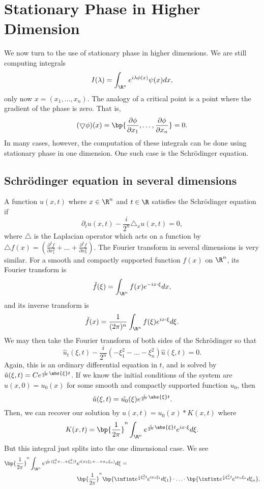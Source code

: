 \section{Stationary Phase in Higher Dimension}
We now turn to the use of stationary phase in higher dimensions. We are still computing integrals
\[
I(\lambda) = \int_{\R^n} e^{i\lambda \phi(x)}\psi(x)dx,
\]
only now $x = (x_1, \ldots, x_n)$. The analogy of a critical point is a point where the gradient of the phase is zero. That is,
\[
(\bigtriangledown \phi)(x) = \bp{\frac{\partial\phi}{\partial x_1}, \ldots, \frac{\partial\phi}{\partial x_n}} = 0.
\]
In many cases, however, the computation of these integrals can be done using stationary phase in one dimension. One such case is the Schr{\"o}dinger equation.
\subsection{Schr{\"o}dinger equation in several dimensions}
A function $u(x, t)$ where $x \in \R^n$ and $t \in \R$ satisfies the Schr{\"o}dinger equation if
\[
	\partial_t u(x, t) - \frac{i}{2^n}\triangle_x u(x, t) = 0,
\]
where $\triangle$ is the Laplacian operator which acts on a function by $\triangle f(x) = (\frac{\partial^2 f}{\partial x_1^2} + \ldots + \frac{\partial^2 f}{\partial x_n^2})$. 
The Fourier transform in several dimensions is very similar. For a smooth and compactly supported function $f(x)$ on $\R^n$, its Fourier transform is
\[
	\hat{f}(\xi) = \int_{\R^n}f(x)e^{-ix\cdot\xi}dx,
\]
and its inverse transform is
\[
	\check{f}(x) = \frac{1}{(2\pi)^n}\int_{\R^n}f(\xi)e^{ix\cdot\xi}d\xi.
\]
We may then take the Fourier transform of both sides of the Schr{\"o}dinger so that
\[
	\hat{u}_t(\xi, t) -\frac{i}{2^n}(-\xi_1^2 - \ldots -\xi_n^2)\hat{u}(\xi, t) = 0.
\]
Again, this is an ordinary differential equation in $t$, and is solved by $\hat{u}(\xi, t) = Ce^{\frac{i}{2^n}\abs{\xi}t}$. If we know the initial conditions of the system are $u(x, 0) = u_0(x)$ for some smooth and compactly supported function $u_0$, then
\[
	\hat{u}(\xi, t) = \hat{u_0}(\xi)e^{\frac{i}{2^n}\abs{\xi}t}.
\]
Then, we can recover our solution by $u(x, t) = u_0(x) \ast K(x, t)$ where
\[
	K(x, t) = \bp{\frac{1}{2\pi}}^n \int_{\R^n} e^{\frac{i}{2^n}\abs{\xi}t}e^{ix\cdot\xi}d\xi.
\]
But this integral just splits into the one dimensional case. We see
\begin{align}
	\notag
	\bp{\frac{1}{2\pi}}^n\int_{\R^n}e^{\frac{i}{2^n}(\xi_1^2 + \ldots + \xi_n^2)t}&e^{i(x_1\xi_1 + \ldots + x_n\xi_n)}d\xi = \\
	\notag &\bp{\frac{1}{2\pi}}^n\bp{\infint e^{\frac{i}{2}\xi_1^2t}e^{ix_1\xi_1}d\xi_1}\cdot\ldots\cdot\bp{\infint e^{\frac{i}{2}\xi_n^2t}e^{ix_n\xi_n}d\xi_n},
\end{align}
